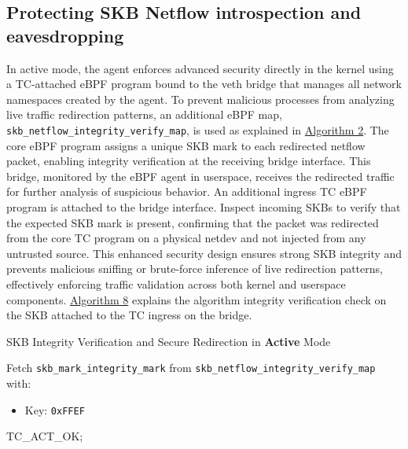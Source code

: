 \documentclass [11pt, proquest] {uwthesis}[2020/02/24]
\begin{document}
\subsection{Protecting SKB Netflow introspection and eavesdropping}
In active mode, the agent enforces advanced security directly in the kernel using a TC-attached eBPF program bound to the veth bridge that manages all network namespaces created by the agent. To prevent malicious processes from analyzing live traffic redirection patterns, an additional eBPF map, \texttt{skb\_netflow\_integrity\_verify\_map}, is used as explained in \hyperref[sec:alg2]{Algorithm 2}. The core eBPF program assigns a unique SKB mark to each redirected netflow packet, enabling integrity verification at the receiving bridge interface. This bridge, monitored by the eBPF agent in userspace, receives the redirected traffic for further analysis of suspicious behavior.
An additional ingress TC eBPF program is attached to the bridge interface. Inspect incoming SKBs to verify that the expected SKB mark is present, confirming that the packet was redirected from the core TC program on a physical netdev and not injected from any untrusted source. This enhanced security design ensures strong SKB integrity and prevents malicious sniffing or brute-force inference of live redirection patterns, effectively enforcing traffic validation across both kernel and userspace components. \hyperref[sec:alg8]{Algorithm 8} explains the algorithm integrity verification check on the SKB attached to the TC ingress on the bridge.

\begin{algorithm}[H]
\label{sec:alg8}
\caption{SKB Integrity Verification and Secure Redirection in \textbf{Active} Mode}
\label{sec:alg_active_mode_integrity}

\small
{}


Fetch \texttt{skb\_mark\_integrity\_mark} from \texttt{skb\_netflow\_integrity\_verify\_map} with:
\begin{itemize}[nosep]
    \item Key: \texttt{0xFFEF} 
\end{itemize}


\Return TC\_ACT\_OK;\
\end{algorithm}
\end{document}
